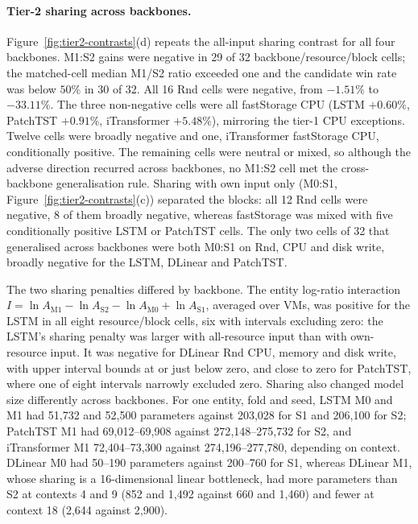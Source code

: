 \documentclass[5p,twocolumn]{elsarticle}
\begin{document}
\paragraph{Tier-2 sharing across backbones.}
Figure~\ref{fig:tier2-contrasts}(d) repeats the all-input sharing contrast
for all four backbones. M1:S2 gains were negative in 29 of 32
backbone/resource/block cells; the matched-cell median M1/S2 ratio exceeded
one and the candidate win rate was below $50\%$ in 30 of 32. All 16 Rnd cells
were negative, from $-1.51\%$ to $-33.11\%$. The three non-negative cells were
all fastStorage CPU (LSTM $+0.60\%$, PatchTST $+0.91\%$, iTransformer
$+5.48\%$), mirroring the tier-1 CPU exceptions. Twelve cells were broadly
negative and one, iTransformer fastStorage CPU, conditionally positive. The
remaining cells were neutral or mixed, so although the adverse direction
recurred across backbones, no M1:S2 cell met the cross-backbone
generalisation rule. Sharing with own input only (M0:S1,
Figure~\ref{fig:tier2-contrasts}(c)) separated the blocks: all 12 Rnd cells
were negative, 8 of them broadly negative, whereas fastStorage was mixed with
five conditionally positive LSTM or PatchTST cells. The only two cells of
32 that generalised across backbones were both M0:S1 on Rnd, CPU and disk
write, broadly negative for the LSTM, DLinear and PatchTST.

The two sharing penalties differed by backbone. The entity log-ratio
interaction $I=\ln A_{\mathrm{M1}}-\ln A_{\mathrm{S2}}-\ln A_{\mathrm{M0}}
+\ln A_{\mathrm{S1}}$, averaged over VMs, was positive for the LSTM in all eight
resource/block cells, six with intervals excluding zero: the LSTM's sharing
penalty was larger with all-resource input than with own-resource input. It
was negative for DLinear Rnd CPU, memory and disk write, with upper interval
bounds at or just below zero, and close to zero for PatchTST, where one of
eight intervals narrowly excluded zero. Sharing also changed model size
differently across backbones. For one entity, fold and seed, LSTM M0 and M1
had 51{,}732 and 52{,}500 parameters against 203{,}028 for S1 and 206{,}100
for S2; PatchTST M1 had 69{,}012--69{,}908 against 272{,}148--275{,}732 for
S2, and iTransformer M1 72{,}404--73{,}300 against 274{,}196--277{,}780,
depending on context. DLinear M0 had 50--190 parameters against 200--760 for
S1, whereas DLinear M1, whose sharing is a 16-dimensional linear bottleneck,
had more parameters than S2 at contexts 4 and 9 (852 and 1{,}492 against 660
and 1{,}460) and fewer at context 18 (2{,}644 against 2{,}900).
\end{document}
